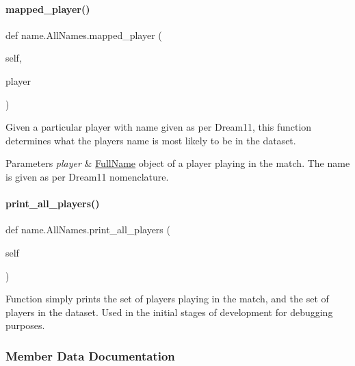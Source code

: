 \paragraph{\texorpdfstring{mapped\+\_\+player()}{mapped\_player()}}
{\footnotesize\ttfamily def name.\+All\+Names.\+mapped\+\_\+player (\begin{DoxyParamCaption}\item[{}]{self,  }\item[{}]{player }\end{DoxyParamCaption})}



Given a particular player with name given as per Dream11, this function determines what the player\textquotesingle{}s name is most likely to be in the dataset. 


\begin{DoxyParams}{Parameters}
{\em player} & \hyperlink{classname_1_1FullName}{Full\+Name} object of a player playing in the match. The name is given as per Dream11 nomenclature. \\
\hline
\end{DoxyParams}
\mbox{\label{classname_1_1AllNames_a224ad6b8dff67b909fd7bddfdbe0244f}} 
\paragraph{\texorpdfstring{print\+\_\+all\+\_\+players()}{print\_all\_players()}}
{\footnotesize\ttfamily def name.\+All\+Names.\+print\+\_\+all\+\_\+players (\begin{DoxyParamCaption}\item[{}]{self }\end{DoxyParamCaption})}

\begin{DoxyVerb}Function simply prints the set of players playing in the match, and the set of players in the dataset. Used in the initial stages of development for debugging purposes.
\end{DoxyVerb}
 

\subsubsection{Member Data Documentation}
\mbox{\label{classname_1_1AllNames_a1c94841db2dd8ff636014a0029e11673}} 
